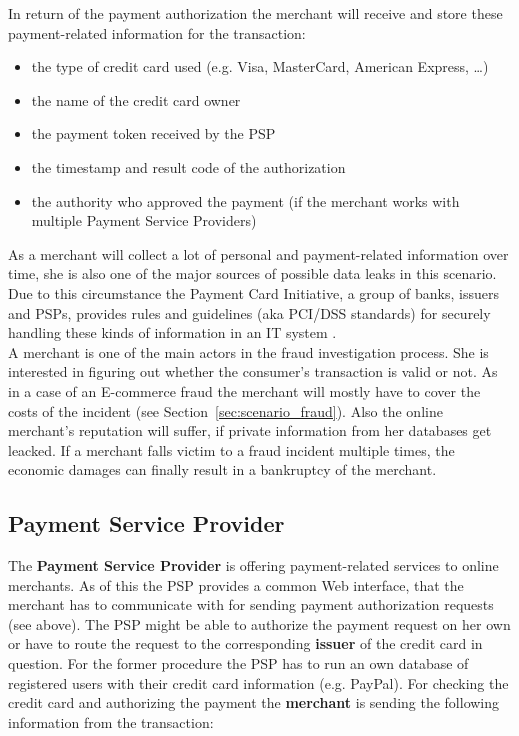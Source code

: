 In return of the payment authorization the merchant will receive and store these  payment-related information for the transaction:\@

\begin{itemize}
		\item the type of credit card used (e.g. Visa, MasterCard, American Express, \ldots)
		\item the name of the credit card owner
		\item the payment token received by the \gls{PSP}
		\item the timestamp and result code of the authorization
		\item the authority who approved the payment (if the merchant works with multiple Payment Service Providers)
\end{itemize}

As a merchant will collect a lot of personal and payment-related information over time, she is also one of the major sources of possible data leaks in this scenario. Due to this circumstance the Payment Card Initiative, a group of banks, issuers and \gls{PSP}s, provides rules and guidelines (aka PCI/DSS standards) for securely handling these kinds of information in an IT system \citep{dss2014payment}. \\

A merchant is one of the main actors in the fraud investigation process. She is interested in figuring out whether the consumer's transaction is valid or not. As in a case of an E-commerce fraud the merchant will mostly have to cover the costs of the incident (see Section~\ref{sec:scenario_fraud}). Also the online merchant's reputation will suffer, if private information from her databases get leacked. If a merchant falls victim to a fraud incident multiple times, the economic damages can finally result in a bankruptcy of the merchant.


\subsection{Payment Service Provider}
\label{subsec:stakeholder_psp}

The \textbf{Payment Service Provider} is offering payment-related services to online merchants. As of this the \gls{PSP} provides a common Web interface, that the merchant has to communicate with for sending payment authorization requests (see above). The \gls{PSP} might be able to authorize the payment request on her own or have to route the request to the corresponding \textbf{issuer} of the credit card in question. For the former procedure the \gls{PSP} has to run an own database of registered users with their credit card information (e.g. PayPal). For checking the credit card and authorizing the payment the \textbf{merchant} is sending the following information from the transaction:\@

